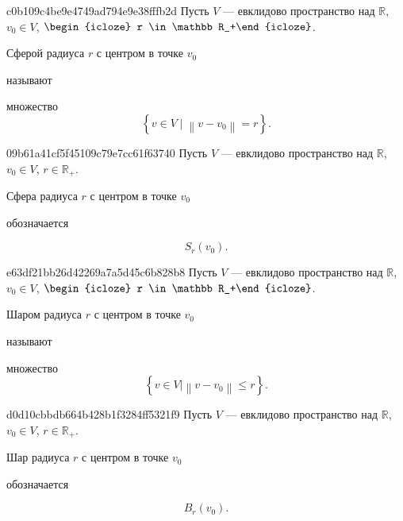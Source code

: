 \begin{note}{c0b109c4be9e4749ad794e9e38fffb2d}
    Пусть \({ V }\) --- евклидово пространство над \({ \mathbb R }\),\: \({ v_0 \in V }\),\: \({ \begin{icloze}{3}r \in \mathbb R_+\end{icloze} }\).
    \begin{icloze}{2}Сферой радиуса \({ r }\) с центром в точке \({ v_0 }\)\end{icloze} называют \begin{icloze}{1}множество
    \[
        \left\{ v \in V \mid \left\lVert v - v_0 \right\rVert = r \right\}.
    \]
\end{icloze}\end{note}

\begin{note}{09b61a41cf5f45109c79e7cc61f63740}
    Пусть \({ V }\) --- евклидово пространство над \({ \mathbb R }\),\: \({ v_0 \in V }\),\: \({ r \in \mathbb R_+ }\).
    \begin{icloze}{2}Сфера радиуса \({ r }\) с центром в точке \({ v_0 }\)\end{icloze} обозначается
    \begin{icloze}{1}
        \[
            S_r (v_0).
        \]
    \end{icloze}
\end{note}

\begin{note}{e63df21bb26d42269a7a5d45c6b828b8}
    Пусть \({ V }\) --- евклидово пространство над \({ \mathbb R }\),\: \({ v_0 \in V }\),\: \({ \begin{icloze}{3}r \in \mathbb R_+\end{icloze} }\).
    \begin{icloze}{2}Шаром радиуса \({ r }\) с центром в точке  \({ v_0 }\)\end{icloze} называют \begin{icloze}{1}множество
        \[
            \left\{ v \in V | \left\lVert v - v_0 \right\rVert \leqslant r \right\}.
        \]
    \end{icloze}
\end{note}

\begin{note}{d0d10cbbdb664b428b1f3284ff5321f9}
    Пусть \({ V }\) --- евклидово пространство над \({ \mathbb R }\),\: \({ v_0 \in V }\),\: \({ r \in \mathbb R_+ }\).
    \begin{icloze}{2}Шар радиуса \({ r }\) с центром в точке \({ v_0 }\)\end{icloze} обозначается
    \begin{icloze}{1}
        \[
            B_r (v_0).
        \]
    \end{icloze}
\end{note}

